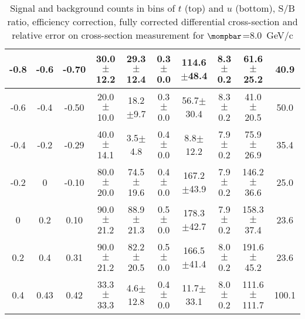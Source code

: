 \begin{landscape}
\begin{table}[hbpt]
\begin{center}
\begin{tabular}{|c|c|c|c|c|c|c|c|c|c|}
 \hline 
 -0.8 & -0.6 & -0.70 & 30.0$\pm$12.2 &  29.3$\pm$12.4 &  0.3$\pm$0.0 &  114.6$\pm$48.4 & 8.3$\pm$0.2 &  61.6$\pm$25.2 & 40.9 \\ 
 \hline 
 -0.6 & -0.4 & -0.50 & 20.0$\pm$10.0 &  18.2$\pm$9.7 &  0.3$\pm$0.0 &  56.7$\pm$30.4 & 8.3$\pm$0.2 &  41.0$\pm$20.5 & 50.0 \\ 
 \hline 
 -0.4 & -0.2 & -0.29 & 40.0$\pm$14.1 &  3.5$\pm$4.8 &  0.4$\pm$0.0 &  8.8$\pm$12.2 & 7.9$\pm$0.2 &  75.9$\pm$26.9 & 35.4 \\ 
 \hline 
 -0.2 & 0 & -0.10 & 80.0$\pm$20.0 &  74.5$\pm$19.6 &  0.4$\pm$0.0 &  167.2$\pm$43.9 & 7.9$\pm$0.2 &  146.2$\pm$36.6 & 25.0 \\ 
 \hline 
 0 & 0.2 & 0.10 & 90.0$\pm$21.2 &  88.9$\pm$21.3 &  0.5$\pm$0.0 &  178.3$\pm$42.7 & 7.9$\pm$0.2 &  158.3$\pm$37.4 & 23.6 \\ 
 \hline 
 0.2 & 0.4 & 0.31 & 90.0$\pm$21.2 &  82.2$\pm$20.5 &  0.5$\pm$0.0 &  166.5$\pm$41.4 & 8.0$\pm$0.2 &  191.6$\pm$45.2 & 23.6 \\ 
 \hline 
 0.4 & 0.43 & 0.42 & 33.3$\pm$33.3 &  4.6$\pm$12.8 &  0.4$\pm$0.0 &  11.7$\pm$33.1 & 8.0$\pm$0.2 &  111.6$\pm$111.7 & 100.1 \\ 
 \hline 
    \end{tabular}
\caption{Signal and background counts in bins of $t$ (top) and $u$
         (bottom), S/B ratio, efficiency correction, fully corrected
         differential cross-section and relative error on cross-section
         measurement for $\mompbar$=8.0~GeV/c}
  \end{center}
\end{table}
\end{landscape}
